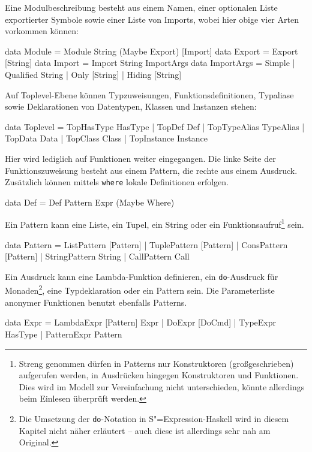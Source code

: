 \documentclass[12pt, a4paper, bibgerm]{scrbook}
\newenvironment{DIFnomarkup}{}{}
\newcommand\icode[1]{\lstinline?#1?}
\newcommand{\sexp}{S"=Expression}
\begin{document}
Eine Modulbeschreibung besteht aus einem Namen, einer optionalen Liste
exportierter Symbole sowie einer Liste von Imports, wobei hier obige
vier Arten vorkommen können:
\begin{DIFnomarkup}\begin{code}
data Module = Module String (Maybe Export) [Import]
data Export = Export [String]
data Import = Import String ImportArgs
data ImportArgs = Simple
                | Qualified String
                | Only [String]
                | Hiding [String]
\end{code}\end{DIFnomarkup}
Auf Toplevel-Ebene können Typzuweisungen, Funktionsdefinitionen,
Typaliase sowie Deklarationen von Datentypen, Klassen und Instanzen stehen:
\begin{DIFnomarkup}\begin{code}
data Toplevel = TopHasType HasType
              | TopDef Def
              | TopTypeAlias TypeAlias
              | TopData Data
              | TopClass Class
              | TopInstance Instance
\end{code}\end{DIFnomarkup}
Hier wird lediglich auf Funktionen weiter eingegangen. Die linke Seite der
Funktionszuweisung besteht aus einem Pattern, die rechte aus einem
Ausdruck. Zusätzlich können mittels \icode{where} lokale Definitionen
erfolgen.
\begin{DIFnomarkup}\begin{code}
data Def = Def Pattern Expr (Maybe Where)
\end{code}\end{DIFnomarkup}
Ein Pattern kann eine Liste, ein Tupel, ein String oder ein
Funktionsaufruf\footnote{Streng genommen dürfen in Patterns nur
  Konstruktoren (großgeschrieben) aufgerufen werden, in Ausdrücken
  hingegen Konstruktoren und Funktionen. Dies wird im Modell zur
  Vereinfachung nicht unterschieden, könnte allerdings beim Einlesen
  überprüft werden.} sein.
\begin{DIFnomarkup}\begin{code}
data Pattern = ListPattern [Pattern]
             | TuplePattern [Pattern]
             | ConsPattern [Pattern]
             | StringPattern String
             | CallPattern Call
\end{code}\end{DIFnomarkup}
Ein Ausdruck kann eine Lambda-Funktion definieren, ein
\icode{do}-Ausdruck für Monaden\footnote{Die Umsetzung der
  \icode{do}-Notation in \sexp{}-Haskell wird in diesem Kapitel nicht
  näher erläutert -- auch diese ist allerdings sehr nah am
  Original.}, eine Typdeklaration oder ein Pattern sein. Die
Parameterliste anonymer Funktionen benutzt ebenfalls Patterns.
\begin{DIFnomarkup}\begin{code}
data Expr = LambdaExpr  [Pattern] Expr
          | DoExpr      [DoCmd]
          | TypeExpr    HasType
          | PatternExpr Pattern
\end{code}\end{DIFnomarkup}
\end{document}
